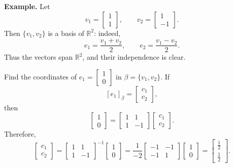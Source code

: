\documentclass{article}
\begin{document}
\medskip

\textbf{Example.} Let
\[
v_1=\begin{bmatrix}1\\1\end{bmatrix},
\qquad
v_2=\begin{bmatrix}1\\-1\end{bmatrix}.
\]
Then $\{v_1,v_2\}$ is a basis of $\mathbb{R}^2$: indeed,
\[
e_1=\frac{v_1+v_2}{2},
\qquad
e_2=\frac{v_1-v_2}{2}.
\]
Thus the vectors span $\mathbb{R}^2$, and their independence is clear.

\medskip

Find the coordinates of $e_1=\begin{bmatrix}1\\0\end{bmatrix}$ in $\beta=\{v_1,v_2\}$. If
\[
[e_1]_\beta=\begin{bmatrix}c_1\\c_2\end{bmatrix},
\]
then
\[
\begin{bmatrix}1\\0\end{bmatrix}
=
\begin{bmatrix}1&1\\1&-1\end{bmatrix}
\begin{bmatrix}c_1\\c_2\end{bmatrix}.
\]
Therefore,
\[
\begin{bmatrix}c_1\\c_2\end{bmatrix}
=
\begin{bmatrix}1&1\\1&-1\end{bmatrix}^{-1}
\begin{bmatrix}1\\0\end{bmatrix}
=\frac{1}{-2}
\begin{bmatrix}-1&-1\\-1&1\end{bmatrix}
\begin{bmatrix}1\\0\end{bmatrix}
=\begin{bmatrix}\tfrac12\\\tfrac12\end{bmatrix}.
\]

\newpage
\end{document}
